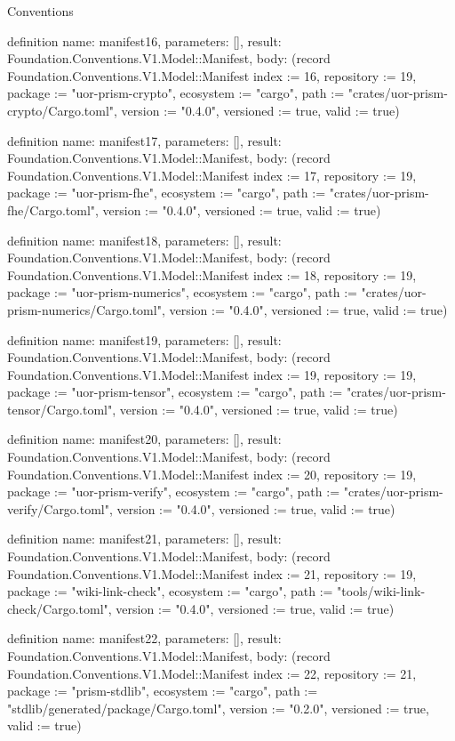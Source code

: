 \begin{lexlean}{Conventions}
\begin{semanticmodule}
definition{
  name: manifest16,
  parameters: [],
  result: Foundation.Conventions.V1.Model::Manifest,
  body: (record Foundation.Conventions.V1.Model::Manifest {index := 16, repository := 19, package := "uor-prism-crypto", ecosystem := "cargo", path := "crates/uor-prism-crypto/Cargo.toml", version := "0.4.0", versioned := true, valid := true})
}

definition{
  name: manifest17,
  parameters: [],
  result: Foundation.Conventions.V1.Model::Manifest,
  body: (record Foundation.Conventions.V1.Model::Manifest {index := 17, repository := 19, package := "uor-prism-fhe", ecosystem := "cargo", path := "crates/uor-prism-fhe/Cargo.toml", version := "0.4.0", versioned := true, valid := true})
}

definition{
  name: manifest18,
  parameters: [],
  result: Foundation.Conventions.V1.Model::Manifest,
  body: (record Foundation.Conventions.V1.Model::Manifest {index := 18, repository := 19, package := "uor-prism-numerics", ecosystem := "cargo", path := "crates/uor-prism-numerics/Cargo.toml", version := "0.4.0", versioned := true, valid := true})
}

definition{
  name: manifest19,
  parameters: [],
  result: Foundation.Conventions.V1.Model::Manifest,
  body: (record Foundation.Conventions.V1.Model::Manifest {index := 19, repository := 19, package := "uor-prism-tensor", ecosystem := "cargo", path := "crates/uor-prism-tensor/Cargo.toml", version := "0.4.0", versioned := true, valid := true})
}

definition{
  name: manifest20,
  parameters: [],
  result: Foundation.Conventions.V1.Model::Manifest,
  body: (record Foundation.Conventions.V1.Model::Manifest {index := 20, repository := 19, package := "uor-prism-verify", ecosystem := "cargo", path := "crates/uor-prism-verify/Cargo.toml", version := "0.4.0", versioned := true, valid := true})
}

definition{
  name: manifest21,
  parameters: [],
  result: Foundation.Conventions.V1.Model::Manifest,
  body: (record Foundation.Conventions.V1.Model::Manifest {index := 21, repository := 19, package := "wiki-link-check", ecosystem := "cargo", path := "tools/wiki-link-check/Cargo.toml", version := "0.4.0", versioned := true, valid := true})
}

definition{
  name: manifest22,
  parameters: [],
  result: Foundation.Conventions.V1.Model::Manifest,
  body: (record Foundation.Conventions.V1.Model::Manifest {index := 22, repository := 21, package := "prism-stdlib", ecosystem := "cargo", path := "stdlib/generated/package/Cargo.toml", version := "0.2.0", versioned := true, valid := true})
}


\end{semanticmodule}
\end{lexlean}
